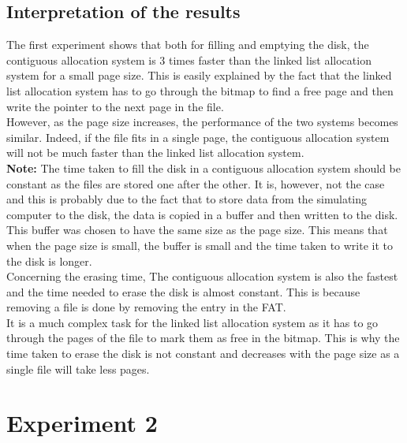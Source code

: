 \documentclass[10pt,a4paper]{ULBreport}
\begin{document}
\subsection{Interpretation of the results}
The first experiment shows that both for filling and emptying the disk, the contiguous allocation system is 3 times faster than the linked list allocation system for a small page size. This is easily explained by the fact that the linked list allocation system has to go through the bitmap to find a free page and then write the pointer to the next page in the file. \\
However, as the page size increases, the performance of the two systems becomes similar. Indeed, if the file fits in a single page, the contiguous allocation system will not be much faster than the linked list allocation system. \\
\textbf{Note: } The time taken to fill the disk in a contiguous allocation system should be constant as the files are stored one after the other. It is, however, not the case and this is probably due to the fact that to store data from the simulating computer to the disk, the data is copied in a buffer and then written to the disk. This buffer was chosen to have the same size as the page size. This means that when the page size is small, the buffer is small and the time taken to write it to the disk is longer. \\
Concerning the erasing time, The contiguous allocation system is also the fastest and the time needed to erase the disk is almost constant. This is because removing a file is done by removing the entry in the FAT. \\
It is a much complex task for the linked list allocation system as it has to go through the pages of the file to mark them as free in the bitmap. This is why the time taken to erase the disk is not constant and decreases with the page size as a single file will take less pages. \\
\section{Experiment 2}
\end{document}
